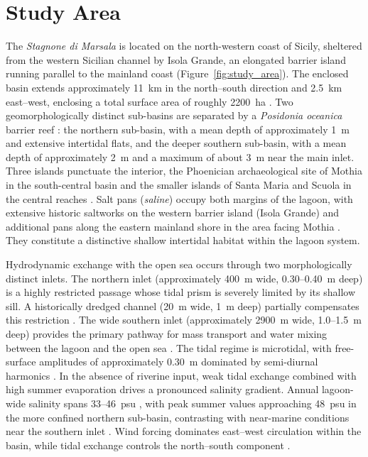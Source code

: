 \section{Study Area}
\label{sec:study_area}

The \emph{Stagnone di Marsala} is located on the north-western coast of
Sicily, sheltered from the western Sicilian channel by Isola Grande, an
elongated barrier island running parallel to the mainland coast
(Figure~\ref{fig:study_area}). The enclosed basin extends approximately 11~km
in the north--south direction and 2.5~km east--west, enclosing a total surface
area of roughly 2200~ha \citep{DeMarchis2012}. Two geomorphologically distinct
sub-basins are separated by a \emph{Posidonia oceanica} barrier reef
\citep{LaLoggia2004}: the northern sub-basin, with a mean depth of
approximately 1~m and extensive intertidal flats, and the deeper southern
sub-basin, with a mean depth of approximately 2~m and a maximum of about 3~m
near the main inlet. Three islands punctuate the interior, the Phoenician
archaeological site of Mothia in the south-central basin and the smaller
islands of Santa Maria and Scuola in the central reaches
\citep{CiraoloDeMarchis2009}. Salt pans (\emph{saline}) occupy both margins of
the lagoon, with extensive historic saltworks on the western barrier island
(Isola Grande) and additional pans along the eastern mainland shore in the
area facing Mothia \citep{Basso2008}. They constitute a distinctive shallow
intertidal habitat within the lagoon system.

Hydrodynamic exchange with the open sea occurs through two morphologically
distinct inlets. The northern inlet (approximately 400~m wide, 0.30--0.40~m
deep) is a highly restricted passage whose tidal prism is severely limited by
its shallow sill. A historically dredged channel (20~m wide, 1~m deep)
partially compensates this restriction \citep{CiraoloDeMarchis2009}. The wide
southern inlet (approximately 2900~m wide, 1.0--1.5~m deep) provides the
primary pathway for mass transport and water mixing between the lagoon and the
open sea \citep{CiraoloDeMarchis2009}. The tidal regime is microtidal, with
free-surface amplitudes of approximately 0.30~m dominated by semi-diurnal
harmonics \citep{LaLoggia2004}. In the absence of riverine input, weak tidal
exchange combined with high summer evaporation drives a pronounced salinity
gradient. Annual lagoon-wide salinity spans 33--46~psu \citep{Basso2008}, with
peak summer values approaching 48~psu in the more confined northern sub-basin,
contrasting with near-marine conditions near the southern inlet
\citep{Mancuso2023}. Wind forcing dominates east--west circulation within the
basin, while tidal exchange controls the north--south component
\citep{CiraoloDeMarchis2009, DeMarchis2012}.

